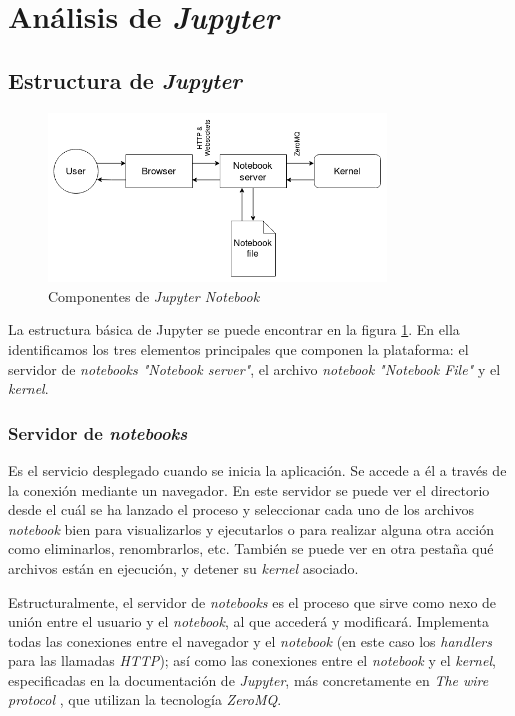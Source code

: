 \documentclass[11pt,spanish,listoffigures]{tfgetsinf}
\begin{document}

\section{Análisis de \textit{Jupyter}}
\label{sec:analisis-jupyter}


\subsection{Estructura de \textit{Jupyter}}
\label{subsec:estructura-jupyter}

\begin{figure}[h]
  \centering
  \includegraphics[width=0.8\textwidth]{jupy.png}
  \caption{Componentes de \textit{Jupyter Notebook}}
  \label{fig:components}
\end{figure}

La estructura básica de Jupyter se puede encontrar en la figura \ref{fig:components}. En ella identificamos los tres elementos principales que componen la plataforma: el servidor de \textit{notebooks "Notebook server"}, el archivo \textit{notebook "Notebook File"} y el \textit{kernel}. 


\subsubsection{Servidor de \textit{notebooks}}
\label{subsec:estructura-servidor}

Es el servicio desplegado cuando se inicia la aplicación. Se accede a él a través de la conexión mediante un navegador. En este servidor se puede ver el directorio desde el cuál se ha lanzado el proceso y seleccionar cada uno de los archivos \textit{notebook} bien para visualizarlos y ejecutarlos o para realizar alguna otra acción como eliminarlos, renombrarlos, etc.
 También se puede ver en otra pestaña qué archivos están en ejecución, y detener su \textit{kernel} asociado.
 
Estructuralmente, el servidor de \textit{notebooks} es el proceso que sirve como nexo de unión entre el usuario y el \textit{notebook}, al que accederá y modificará. Implementa todas las conexiones entre el navegador y el \textit{notebook} (en este caso los \textit{\gls{handler}s} para las llamadas \textit{\gls{HTTP}}); así como las conexiones entre el \textit{notebook} y el \textit{kernel}, especificadas en la documentación de \textit{Jupyter}, más concretamente en \textit{The wire protocol} \cite{wire-protocol}, que utilizan la tecnología \textit{ZeroMQ}.
\end{document}
